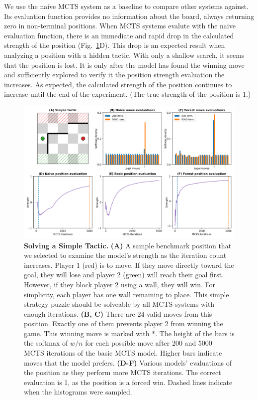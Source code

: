 \documentclass[10pt]{article}
\begin{document}
We use the naive MCTS system as a baseline to compare other systems against. Its evaluation function provides no information about the board, always returning zero in non-terminal positions. When MCTS systems evalute with the naive evaluation function, there is an immediate and rapid drop in the calculated strength of the position (Fig.~\ref{fig:MCTS}D). This drop is an expected result when analyzing a position with a hidden tactic. With only a shallow search, it seems that the position is lost. It is only after the model has found the winning move and sufficiently explored to verify it the position strength evaluation the increases. As expected, the calculated strength of the position continues to increase until the end of the experiment. (The true strength of the position is 1.)



\begin{figure}[H]
    \centering
    \includegraphics[width=\linewidth]{MCTS_eval.png}
    \caption{\textbf{Solving a Simple Tactic.} \textbf{(A)} A sample benchmark position that we selected to examine the model's strength as the iteration count increases. Player 1 (red) is to move. If they move directly toward the goal, they will lose and player 2 (green) will reach their goal first. However, if they block player 2 using a wall, they will win. For simplicity, each player has one wall remaining to place. This simple strategy puzzle should be solveable by all MCTS systems with enough iterations. \textbf{(B, C)} There are 24 valid moves from this position. Exactly one of them prevents player 2 from winning the game. This winning move is marked with *. The height of the bars is the softmax of $w/n$ for each possible move after 200 and 5000 MCTS iterations of the basic MCTS model. Higher bars indicate moves that the model prefers. \textbf{(D-F)} Various models' evaluations of the position as they perform more MCTS iterations. The correct evaluation is 1, as the position is  a forced win. Dashed lines indicate when the histograms were sampled.}
    \label{fig:MCTS}
\end{figure}
\end{document}
